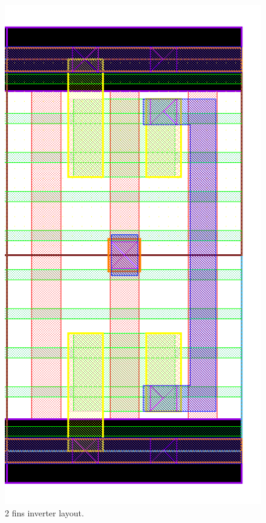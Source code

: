 \documentclass[pgmicro,mestrado,english]{iiufrgs}
\begin{document}
\begin{figure}[H]
\centering
\includegraphics[width=\textwidth,height=\textheight,keepaspectratio]{INV2F.png}
\caption{2 fins inverter layout.}
\label{fig:INV2F}
\end{figure}
\end{document}
